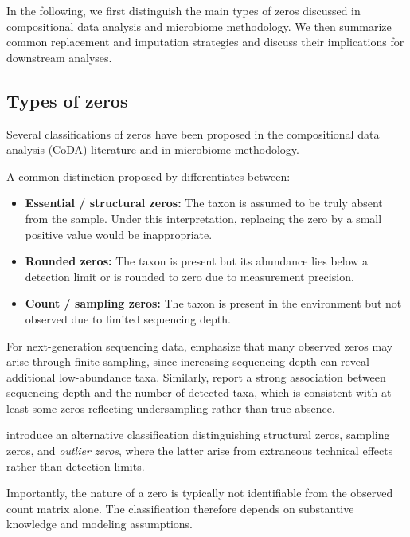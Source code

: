 In the following, we first distinguish the main types of zeros discussed in compositional data analysis and microbiome methodology. We then summarize common replacement and imputation strategies and discuss their implications for downstream analyses.

\subsection{Types of zeros}
\label{sec:2micro:zeros:types}

Several classifications of zeros have been proposed in the compositional data analysis (CoDA) literature and in microbiome methodology.

A common distinction proposed by \citet{martin2011dealing} differentiates between:

\begin{itemize}
    \item \textbf{Essential / structural zeros:} The taxon is assumed to be truly absent from the sample. Under this interpretation, replacing the zero by a small positive value would be inappropriate.
    
    \item \textbf{Rounded zeros:} The taxon is present but its abundance lies below a detection limit or is rounded to zero due to measurement precision.

    \item \textbf{Count / sampling zeros:} The taxon is present in the environment but not observed due to limited sequencing depth.
\end{itemize}

For next-generation sequencing data, \citet{quinn2019field} emphasize that many observed zeros may arise through finite sampling, since increasing sequencing depth can reveal additional low-abundance taxa.
Similarly, \citet{paulson2013differential} report a strong association between sequencing depth and the number of detected taxa, which is consistent with at least some zeros reflecting undersampling rather than true absence.

\citet{kaul2017analysis} introduce an alternative classification distinguishing structural zeros, sampling zeros, and \emph{outlier zeros}, where the latter arise from extraneous technical effects rather than detection limits. 

Importantly, the nature of a zero is typically not identifiable from the observed count matrix alone. The classification therefore depends on substantive knowledge and modeling assumptions.


